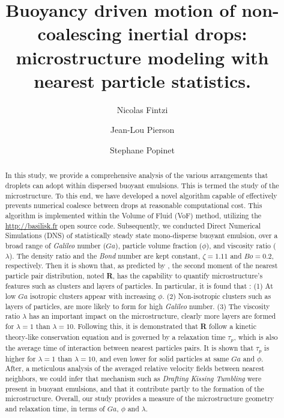 \documentclass[11pt]{My_preprint}
\title{
Buoyancy driven motion of non-coalescing inertial drops: microstructure modeling with nearest particle statistics. %
    }
\author[1,2]{Nicolas Fintzi}
\author[1]{Jean-Lou Pierson}
\author[2]{Stephane Popinet}
\affil[1]{IFP Energies Nouvelles, Rond-point de l’echangeur de Solaize, 69360 Solaize}
\affil[2]{Sorbonne Universit\'e, Institut Jean le Rond d'Alembert, 4 place Jussieu, 75252 PARIS CEDEX 05, France}
\begin{document}
\maketitle

\begin{abstract}
    In this study, we provide a comprehensive analysis of the various  arrangements that droplets can adopt within dispersed buoyant emulsions. 
    This is termed the study of the microstructure.
    To this end, we have developed a novel algorithm capable of effectively prevents numerical coalesce between drops at reasonable computational cost.
    This algorithm is implemented within the Volume of Fluid (VoF) method, utilizing the \href{http://basilisk.fr}{http://basilisk.fr} open source code. 
    Subsequently, we conducted Direct Numerical Simulations (DNS) of statistically steady state mono-disperse buoyant emulsion, over a broad range of \textit{Galileo} number ($Ga$), particle volume fraction ($\phi$), and viscosity ratio ($\lambda$). 
    The density ratio and the \textit{Bond} number are kept constant, $\zeta = 1.11$ and  $Bo = 0.2$, respectively. 
    Then it is shown that, as predicted by \citet{zhang2023evolution}, the second moment of the nearest particle pair distribution, noted \textbf{R}, has the capability to quantify microstructure's features such as clusters and layers of particles.
    In particular, it is found that : 
    (1) At low $Ga$ isotropic clusters appear with increasing $\phi$. 
    (2) Non-isotropic clusters such as layers of particles, are more likely to form for high \textit{Galileo} number.
    (3) The viscosity ratio $\lambda$ has an important impact on the microstructure, clearly more layers are formed for $\lambda = 1$ than $\lambda = 10$. 
    Following this, it is  demonstrated that \textbf{R} follow a kinetic theory-like conservation equation and is governed by a relaxation time $\tau_p$, which is also the average time of interaction between nearest particles pairs. 
    It is shown that $\tau_p$ is higher for $\lambda = 1$ than 
    $\lambda = 10$, and even lower for solid particles at same $Ga$ and $\phi$.
    After, a meticulous analysis of the averaged relative velocity fields between nearest neighbors, we could infer that mechanism such as \textit{Drafting Kissing Tumbling} \citep{fortes1987nonlinear} were present in buoyant emulsions, and that it contribute partly to the formation of the microstructure.
    Overall, our study provides a measure of the microstructure geometry and relaxation time, in terms of $Ga$, $\phi$ and $\lambda$. 
\end{abstract}
\end{document}
